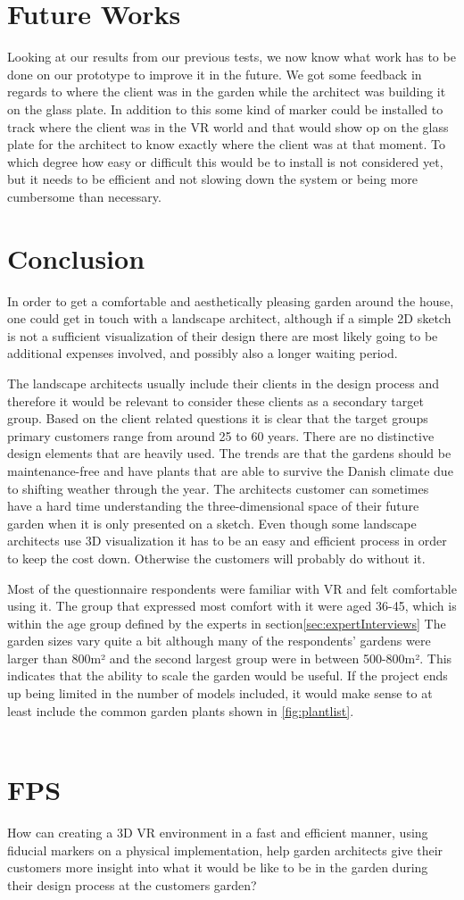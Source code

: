 	
\section {Future Works}
Looking at our results from our previous tests, we now know what work has to be done on our prototype to improve it in the future. We got some feedback in regards to where the client was in the garden while the architect was building it on the glass plate. In addition to this some kind of marker could be installed to track where the client was in the VR world and that would show op on the glass plate for the architect to know exactly where the client was at that moment. To which degree how easy or difficult this would be to install is not considered yet, but it needs to be efficient and not slowing down the system or being more cumbersome than necessary.



\section {Conclusion}
In order to get a comfortable and aesthetically pleasing garden around the house, one could get in touch with a landscape architect, although if a simple 2D sketch is not a sufficient visualization of their design there are most likely going to be additional expenses involved, and possibly also a longer waiting period.

The landscape architects usually include their clients in the design process and therefore it would be relevant to consider these clients as a secondary target group. Based on the client related questions it is clear that the target groups primary customers range from around 25 to 60 years. There are no distinctive design elements that are heavily used. The trends are that the gardens should be maintenance-free and have plants that are able to survive the Danish climate due to shifting weather through the year. The architects customer can sometimes have a hard time understanding the three-dimensional space of their future garden when it is only presented on a sketch. Even though some landscape architects use 3D visualization it has to be an easy and efficient process in order to keep the cost down. Otherwise the customers will probably do without it.

Most of the questionnaire respondents were familiar with VR and felt comfortable using it. The group that expressed most comfort with it were aged 36-45, which is within the age group defined by the experts in section\autoref{sec:expertInterviews}
The garden sizes vary quite a bit although many of the respondents' gardens were larger than 800m² and the second largest group were in between 500-800m². This indicates that the ability to scale the garden would be useful. If the project ends up being limited in the number of models included, it would make sense to at least include the common garden plants shown in \autoref{fig:plantlist}.\\\\
\section*{FPS}
How can creating a 3D VR environment in a fast and efficient manner, using fiducial markers on a physical implementation, help garden architects give their customers more insight into what it would be like to be in the garden during their design process at the customers garden?